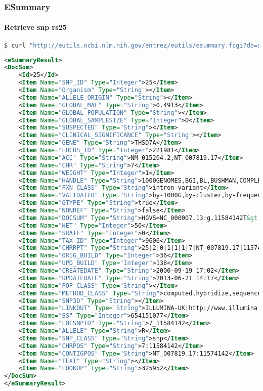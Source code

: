 \documentclass{beamer}
\begin{document}
\begin{frame}[fragile]
\frametitle{ESummary}
\framesubtitle{Retrieve snp rs25}
\begin{lstlisting}[language=bash,basicstyle=\tiny,breaklines=true]
$ curl "http://eutils.ncbi.nlm.nih.gov/entrez/eutils/esummary.fcgi?db=snp&id=25"
\end{lstlisting}

\begin{lstlisting}[language=xml,basicstyle=\tiny,breaklines=false]
<eSummaryResult>
<DocSum>
	<Id>25</Id>
	<Item Name="SNP_ID" Type="Integer">25</Item>
	<Item Name="Organism" Type="String"></Item>
	<Item Name="ALLELE_ORIGIN" Type="String"></Item>
	<Item Name="GLOBAL_MAF" Type="String">0.4913</Item>
	<Item Name="GLOBAL_POPULATION" Type="String"></Item>
	<Item Name="GLOBAL_SAMPLESIZE" Type="Integer">0</Item>
	<Item Name="SUSPECTED" Type="String"></Item>
	<Item Name="CLINICAL_SIGNIFICANCE" Type="String"></Item>
	<Item Name="GENE" Type="String">THSD7A</Item>
	<Item Name="LOCUS_ID" Type="Integer">221981</Item>
	<Item Name="ACC" Type="String">NM_015204.2,NT_007819.17</Item>
	<Item Name="CHR" Type="String">7</Item>
	<Item Name="WEIGHT" Type="Integer">1</Item>
	<Item Name="HANDLE" Type="String">1000GENOMES,BGI,BL,BUSHMAN,COMPLETE_GENOMICS,CSHL-HAPMAP,GMI,ILLUMINA-UK,KWOK,PERLEGEN,SSMP,TISHKOFF</Item>
	<Item Name="FXN_CLASS" Type="String">intron-variant</Item>
	<Item Name="VALIDATED" Type="String">by-1000G,by-cluster,by-frequency,by-hapmap</Item>
	<Item Name="GTYPE" Type="String">true</Item>
	<Item Name="NONREF" Type="String">false</Item>
	<Item Name="DOCSUM" Type="String">HGVS=NC_000007.13:g.11584142T&gt;C,NG_027670.1:g.292683A&gt;G,NM_015204.2:c.1454-1398A&gt;G,NT_007819.17:g.11574142T&gt;C|SEQ=TCTGTGAGCTTCTGCATGCAATCCT[A/G]TGCAATTGGAATTTGATAGTCCTTT|GENE=THSD7A:221981</Item>
	<Item Name="HET" Type="Integer">50</Item>
	<Item Name="SRATE" Type="Integer">0</Item>
	<Item Name="TAX_ID" Type="Integer">9606</Item>
	<Item Name="CHRRPT" Type="String">25|2|0|1|1|1|7|NT_007819.17|11574141|11584142|THSD7A|0.499848|0.00872267| |51|1|1|36|138|0| | |T:2178:0.4913</Item>
	<Item Name="ORIG_BUILD" Type="Integer">36</Item>
	<Item Name="UPD_BUILD" Type="Integer">138</Item>
	<Item Name="CREATEDATE" Type="String">2000-09-19 17:02</Item>
	<Item Name="UPDATEDATE" Type="String">2013-06-21 14:17</Item>
	<Item Name="POP_CLASS" Type="String"></Item>
	<Item Name="METHOD_CLASS" Type="String">computed,hybridize,sequence,unknown</Item>
	<Item Name="SNP3D" Type="String"></Item>
	<Item Name="LINKOUT" Type="String">ILLUMINA-UK|http://www.illumina.com/HumanGenomeNA18507_000019106_NCBI36.1_chr7_11550667</Item>
	<Item Name="SS" Type="Integer">654151077</Item>
	<Item Name="LOCSNPID" Type="String">7_11584142</Item>
	<Item Name="ALLELE" Type="String">R</Item>
	<Item Name="SNP_CLASS" Type="String">snp</Item>
	<Item Name="CHRPOS" Type="String">7:11584142</Item>
	<Item Name="CONTIGPOS" Type="String">NT_007819.17:11574142</Item>
	<Item Name="TEXT" Type="String"></Item>
	<Item Name="LOOKUP" Type="String">325952</Item>
</DocSum>
</eSummaryResult>
\end{lstlisting}
\end{frame}
\end{document}
